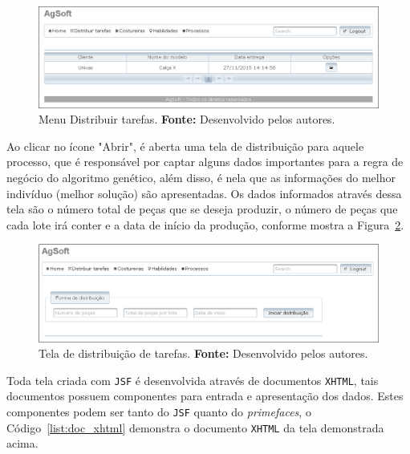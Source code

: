 \begin{figure}[h!]
	\centerline{\includegraphics[width=14.7cm]{./imagens/tela_distribuicao_processos.png}}
	\caption[Menu Distribuir tarefas.]
	{Menu Distribuir tarefas.
		\textbf{Fonte:} Desenvolvido pelos autores.}
	\label{fig:tela_dis_processos}
\end{figure}

\par Ao clicar no ícone "Abrir", é aberta uma tela de distribuição para aquele processo, que é responsável por captar alguns
dados importantes para a regra de negócio do algoritmo genético, além disso, é nela que as informações do melhor indivíduo (melhor
solução) são apresentadas.  Os dados informados através dessa tela são o número total de peças que se deseja produzir, o número de 
peças que cada lote irá conter e a data de início da produção, conforme mostra a Figura~\ref{fig:tela_dis_open}.

\begin{figure}[h!]
	\centerline{\includegraphics[width=14.7cm]{./imagens/tela_distribuicao_open.png}}
	\caption[Tela de distribuição de tarefas.]
	{Tela de distribuição de tarefas.
		\textbf{Fonte:} Desenvolvido pelos autores.}
	\label{fig:tela_dis_open}
\end{figure}

\par Toda tela criada com \texttt{JSF} é desenvolvida através de documentos \texttt{XHTML}, tais documentos possuem componentes para entrada e apresentação dos dados. Estes componentes podem ser tanto do \texttt{JSF} quanto do \textit{primefaces}, o Código~\ref{list:doc_xhtml} demonstra o documento \texttt{XHTML} da tela demonstrada acima.

